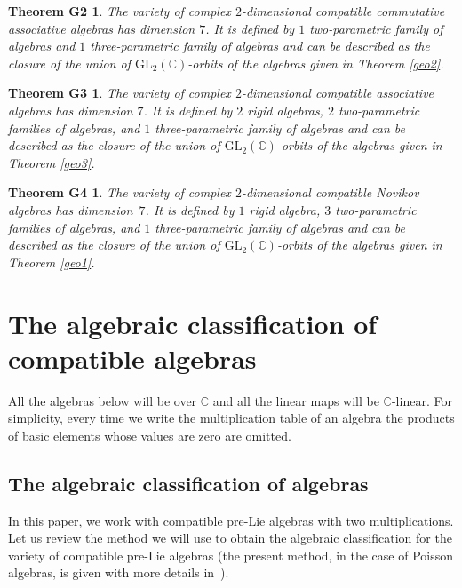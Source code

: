 \documentclass[10pt,a4paper]{amsart}
\numberwithin{equation}{section}
\newtheorem*{theoremG2}{Theorem G2}
\newtheorem*{theoremG3}{Theorem G3}
\newtheorem*{theoremG4}{Theorem G4}
\begin{document}
\begin{theoremG2}
The variety of complex $2$-dimensional compatible commutative associative algebras has dimension $7$.
It is defined by
$1$ two-parametric family of algebras
and $1$ three-parametric family of algebras and can be described as the closure of the union of $\mathrm{GL}_2(\mathbb{C})$-orbits of the algebras given in Theorem {\rm\ref{geo2}}.
\end{theoremG2}

\begin{theoremG3}
The variety of complex $2$-dimensional compatible associative algebras has dimension $7$.
It is defined by $2$ rigid algebras,
$2$ two-parametric families of algebras,
and $1$ three-parametric family of algebras and can be described as the closure of the union of $\mathrm{GL}_2(\mathbb{C})$-orbits of the algebras given in Theorem {\rm\ref{geo3}}.
\end{theoremG3}

 \begin{theoremG4}
The variety of complex $2$-dimensional compatible Novikov algebras has dimension~$7$.
It is defined by $1$ rigid algebra,
$3$ two-parametric families of algebras,
and $1$ three-parametric family of algebras and can be described as the closure of the union of $\mathrm{GL}_2(\mathbb{C})$-orbits of the algebras given in Theorem {\rm\ref{geo1}}.
\end{theoremG4}

\section{The algebraic classification of compatible algebras}

All the algebras below will be over $\mathbb C$ and all the linear maps will be $\mathbb C$-linear.
For simplicity, every time we write the multiplication table of an algebra
the products of basic elements whose values are zero are omitted.

\subsection{The algebraic classification of algebras}
In this paper, we work with compatible pre-Lie algebras with two multiplications. Let us review the method we will use to obtain the algebraic classification for the variety of compatible pre-Lie algebras
(the present method, in the case of Poisson algebras, is given with more details in~\cite{fkkv,afm}).
\end{document}
